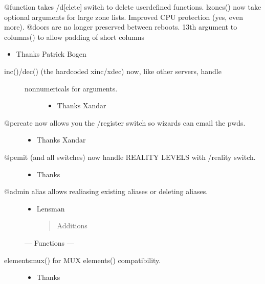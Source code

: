 \documentclass[letterpaper,10pt,english]{sphinxmanual}
\begin{document}
\sphinxAtStartPar
@function takes /d{[}elete{]} switch to delete user\sphinxhyphen{}defined functions.
lzones() now take optional arguments for large zone lists.
Improved CPU protection (yes, even more).
@doors are no longer preserved between reboots.
13th argument to columns() to allow padding of short columns
\begin{itemize}
\item {} 
\sphinxAtStartPar
Thanks Patrick Bogen

\end{itemize}
\begin{description}
\item[{inc()/dec() (the hardcoded xinc/xdec) now, like other servers, handle}] \leavevmode\begin{description}
\item[{non\sphinxhyphen{}numericals for arguments.}] \leavevmode\begin{itemize}
\item {} 
\sphinxAtStartPar
Thanks Xandar

\end{itemize}

\end{description}

\item[{@pcreate now allows you the /register switch so wizards can email the pwds.}] \leavevmode\begin{itemize}
\item {} 
\sphinxAtStartPar
Thanks Xandar

\end{itemize}

\item[{@pemit (and all switches) now handle REALITY LEVELS with /reality switch.}] \leavevmode\begin{itemize}
\item {} 
\sphinxAtStartPar
Thanks 

\end{itemize}

\item[{@admin alias allows re\sphinxhyphen{}aliasing existing aliases or deleting aliases.}] \leavevmode\begin{itemize}
\item {} 
\sphinxAtStartPar
Lensman
\begin{quote}

\sphinxAtStartPar
Additions
\end{quote}

\end{itemize}

\sphinxAtStartPar
— Functions —

\item[{elementsmux() \sphinxhyphen{} for MUX elements() compatibility.}] \leavevmode\begin{itemize}
\item {} 
\sphinxAtStartPar
Thanks 

\end{itemize}

\end{description}
\end{document}
